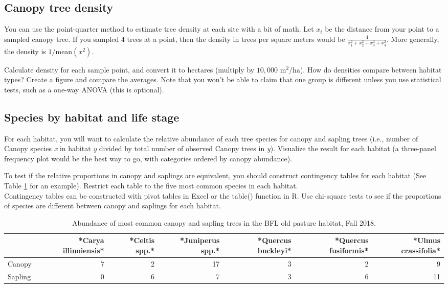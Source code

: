 \documentclass[]{book}
\begin{document}
\subsection{Canopy tree density}\label{canopy-tree-density}

You can use the point-quarter method to estimate tree density at each
site with a bit of math. Let \(x_i\) be the distance from your point to
a sampled canopy tree. If you sampled 4 trees at a point, then the
density in trees per square meters would be
\(\frac{4}{x_1^2 + x_2^2 + x_3^2 + x_4^2}\). More generally, the density
is \(1 / \text{mean}(x^2)\).

Calculate density for each sample point, and convert it to hectares
(multiply by \(10,000 \text{ m}^2/\text{ha}\)). How do densities compare
between habitat types? Create a figure and compare the averages. Note
that you won't be able to claim that one group is different unless you
use statistical tests, such as a one-way ANOVA (this is optional).

\subsection{Species by habitat and life
stage}\label{species-by-habitat-and-life-stage}

For each habitat, you will want to calculate the relative abundance of
each tree species for canopy and sapling trees (i.e., number of Canopy
species \emph{x} in habitat \emph{y} divided by total number of observed
Canopy trees in \emph{y}). Visualize the result for each habitat (a
three-panel frequency plot would be the best way to go, with categories
ordered by canopy abundance).

To test if the relative proportions in canopy and saplings are
equivalent, you should construct contingency tables for each habitat
(See Table \ref{tab:contingency} for an example). Restrict each table to
the five most common species in each habitat.\\
Contingency tables can be constructed with pivot tables in Excel or the
table() function in R. Use chi-square tests to see if the proportions of
species are different between canopy and saplings for each habitat.

\begin{table}

\caption{\label{tab:contingency}Abundance of most common canopy and sapling trees in the BFL old pasture habitat, Fall 2018.}
\centering
\begin{tabular}[t]{l|r|r|r|r|r|r}
\hline
  & *Carya illinoiensis* & *Celtis spp.* & *Juniperus spp.* & *Quercus buckleyi* & *Quercus fusiformis* & *Ulmus crassifolia*\\
\hline
Canopy & 7 & 2 & 17 & 3 & 2 & 9\\
\hline
Sapling & 0 & 6 & 7 & 3 & 6 & 11\\
\hline
\end{tabular}
\end{table}
\end{document}
